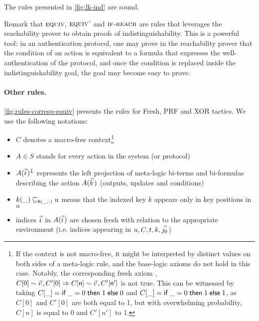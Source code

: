 \begin{lemma}
  The rules presented in \cref{fig:lk-ind} are sound.
\end{lemma}

Remark that $\textsc{equiv}$, $\textsc{equiv'}$ and  $\textsc{if-reach}$  are rules that leverages the reachability prover to obtain proofs of indistinguishability. This is a powerful tool: in an authentication protocol, one may prove in the reachability prover that the condition of an action is equivalent to a formula that expresses the well-authentication of the protocol, and once the condition is replaced inside the indistinguishability goal, the goal may become easy to prove.

\paragraph{Other rules.}

\cref{fig:rules-corresp-equiv} presents the rules for Fresh, PRF and XOR tactics.
We use the following notations:
\begin{itemize}
  \item  $C$ denotes a macro-free context\footnote{If the context is not macro-free, it might be interpreted by distinct values on both sides of a meta-logic rule, and the base-logic axioms do not hold in this case. Notably, the corresponding fresh axiom , $C[0] \sim \pvec{v}, C'[0] \Rightarrow  C[\mathsf{n}] \sim \pvec{v}, C'[\mathsf{n}']$ is not true. This can be witnessed by taking $C[\_]= \textsf{if}\; \_ = 0 \;\textsf{then}\; 1 \;\textsf{else}\; 0$ and  $C[\_]= \textsf{if}\; \_ = 0 \;\textsf{then}\; 1 \;\textsf{else}\; 1$, as $C[0]$ and $C'[0]$ are both equal to 1, but with overwhelming probability,  $C[n]$ is equal to 0 and $C'[n']$ to 1.}
\item $A \in S$ stands for every action in the system (or protocol)
\item $A(\pvec i)^L$ represents the left projection of meta-logic bi-terms and bi-formulas describing the action $A(\pvec k)$ (outputs, updates and conditions)
\item $k(\_) \sqsubseteq_{\mathsf{h}(\_,\cdot)} u$ means that the indexed key $k$ appears only in key positions in $u$
\item indices $\pvec i$ in $A(\pvec i)$ are chosen fresh with relation to the appropriate environment (i.e. indices appearing in $u, C, t, k, \pvec {j_0}$)
\end{itemize}

